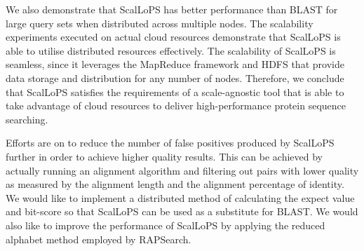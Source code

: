 \documentclass[titlepage]{csetr}
\begin{document}
We also demonstrate that ScalLoPS has better performance than BLAST for large query sets when distributed across multiple nodes. The scalability experiments executed on actual cloud resources demonstrate that ScalLoPS is able to utilise distributed resources effectively. The scalability of ScalLoPS is seamless, since it leverages the MapReduce framework and HDFS that provide data storage and distribution for any number of nodes. Therefore, we conclude that ScalLoPS satisfies the requirements of a scale-agnostic tool that is able to take advantage of cloud resources to deliver high-performance protein sequence searching.

Efforts are on to reduce the number of false positives produced by ScalLoPS further in order to achieve higher quality results. This can be achieved by actually running an alignment algorithm and filtering out pairs with lower quality as measured by the alignment length and the alignment percentage of identity. We would like to implement a distributed method of calculating the expect value and bit-score so that ScalLoPS can be used as a substitute for BLAST. We would also like to improve the performance of ScalLoPS by applying the reduced alphabet method employed by RAPSearch.













\end{document}

